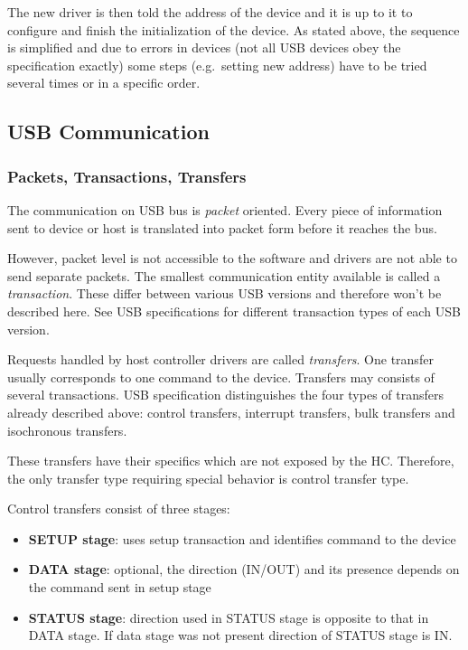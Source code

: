 The new driver is then told the address of the device and it is up to it to
configure and finish the initialization of the device.
As stated above, the sequence is simplified and due to errors in devices (not
all USB devices obey the specification exactly) some steps (e.g.\ setting new
address) have to be tried several times or in a specific order.

\subsection{USB Communication}

\subsubsection{Packets, Transactions, Transfers}

The communication on USB bus is \textit{packet} oriented. Every piece of
information sent to device or host is translated into packet form before it
reaches the bus.

However, packet level is not accessible to the software and drivers are not
able to send separate packets. The smallest communication entity available is
called a \textit{transaction}. These differ between various USB versions and
therefore won't be described here. See USB specifications for different
transaction types of each USB version.

Requests handled by host controller drivers are called \textit{transfers}. One
transfer usually corresponds to one command to the device. Transfers may
consists of several transactions. USB specification distinguishes the four
types of transfers already described above: control transfers, interrupt
transfers, bulk transfers and isochronous transfers.

These transfers have their specifics which are not exposed by the HC.
Therefore, the only transfer type requiring special behavior is control
transfer type.

Control transfers consist of three stages:
\begin{itemize}
\item \textbf{SETUP stage}: uses setup transaction and identifies command to
the device
\item \textbf{DATA stage}: optional, the direction (IN/OUT) and its presence
depends on the command sent in setup stage
\item \textbf{STATUS stage}: direction used in STATUS stage is opposite to that
in DATA stage. If data stage was not present direction of STATUS stage is IN.
\end{itemize}


